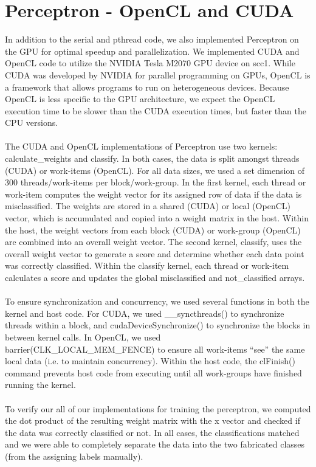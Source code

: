 \documentclass{article}
\begin{document}
\section{Perceptron - OpenCL and CUDA }
In addition to the serial and pthread code, we also implemented Perceptron on the GPU for optimal speedup and parallelization. We implemented CUDA and OpenCL code to utilize the NVIDIA Tesla M2070 GPU device on scc1. While CUDA was developed by NVIDIA for parallel programming on GPUs, OpenCL is a framework that allows programs to run on heterogeneous devices. Because OpenCL is less specific to the GPU architecture, we expect the OpenCL execution time to be slower than the CUDA execution times, but faster than the CPU versions.
\\ \\
The CUDA and OpenCL implementations of Perceptron use two kernels: calculate\_weights and classify. In both cases, the data is split amongst threads (CUDA) or work-items (OpenCL). For all data sizes, we used a set dimension of 300 threads/work-items per block/work-group. In the first kernel, each thread or work-item computes the weight vector for its assigned row of data if the data is misclassified. The weights are stored in a shared (CUDA) or local (OpenCL) vector, which is accumulated and copied into a weight matrix in the host. Within the host, the weight vectors from each block (CUDA) or work-group (OpenCL) are combined into an overall weight vector. The second kernel, classify, uses the overall weight vector to generate a score and determine whether each data point was correctly classified. Within the classify kernel, each thread or work-item calculates a score and updates the global misclassified and not\_classified arrays. 
\\ \\
To ensure synchronization and concurrency, we used several functions in both the kernel and host code. For CUDA, we used \_\_syncthreads() to synchronize threads within a block, and cudaDeviceSynchronize() to synchronize the blocks in between kernel calls. In OpenCL, we used barrier(CLK\_LOCAL\_MEM\_FENCE) to ensure all work-items ``see'' the same local data (i.e. to maintain concurrency). Within the host code, the clFinish() command prevents host code from executing until all work-groups have finished running the kernel. 
\\ \\
To verify our all of our implementations for training the perceptron, we computed the dot product of the resulting weight matrix with the x vector and checked if the data was correctly classified or not. In all cases, the classifications matched and we were able to completely separate the data into the two fabricated classes (from the assigning labels manually).
\end{document}
